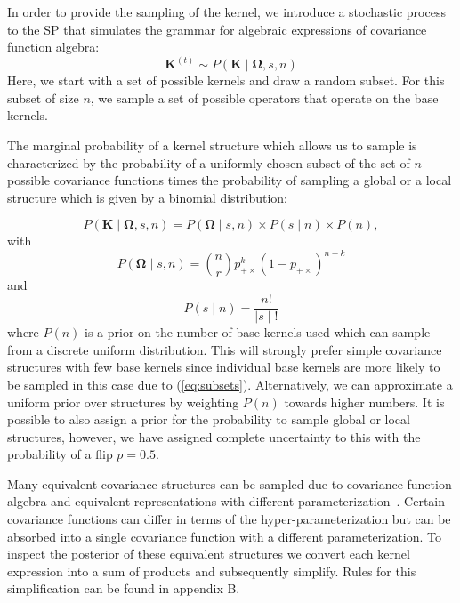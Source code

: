 In order to provide the sampling of the kernel, we introduce a stochastic process to the SP that simulates the grammar for algebraic expressions of covariance function algebra:
\begin{equation}
\mathbf{K}^{(t)} \sim  P(\mathbf{K} \mid \bm{\Omega},s,n)
\end{equation}
Here, we start with a set of possible kernels and draw a random subset. For this subset of size $n$, we sample a set of possible operators that operate on the base kernels. 

The marginal probability of a kernel structure which allows us to sample  is characterized by the probability of a uniformly chosen subset of the set of $n$ possible covariance functions times the probability of sampling a global or a local structure which is given by a binomial distribution: 

\begin{equation}
P(\mathbf{K} \mid \bm{\Omega},s,n) = P(\bm{\Omega} \mid s,n)\times P(s \mid n) \times P(n),
\end{equation}
with
\begin{equation}
P(\bm{\Omega} \mid s,n)= {n \choose r}  p_{+\times}^k (1 - p_{+\times})^{n-k}
\end{equation}
and
\begin{equation}
\label{eq:subsets}
P(s \mid n) = \frac{n!}{ \mid s \mid !}
\end{equation}
where $P(n)$ is a prior on the number of base kernels used which can sample from a discrete uniform distribution. This will strongly prefer simple covariance structures with few base kernels since individual base kernels are more likely to be sampled in this case due to (\ref{eq:subsets}). Alternatively, we can approximate a uniform prior over structures by weighting $P(n)$ towards higher numbers. It is possible to also assign a prior for the probability to sample global or local structures, however, we have assigned complete uncertainty to this with the probability of a flip $p = 0.5$.



Many equivalent covariance structures can be sampled due to covariance function algebra and equivalent representations with different parameterization~\citep{lloyd2014automatic}. Certain covariance functions can differ in terms of the hyper-parameterization but can be absorbed into a single covariance function with a different parameterization. To inspect the posterior of these equivalent structures we convert each kernel expression into a sum of products and subsequently simplify. Rules for this simplification can be found in appendix B.


